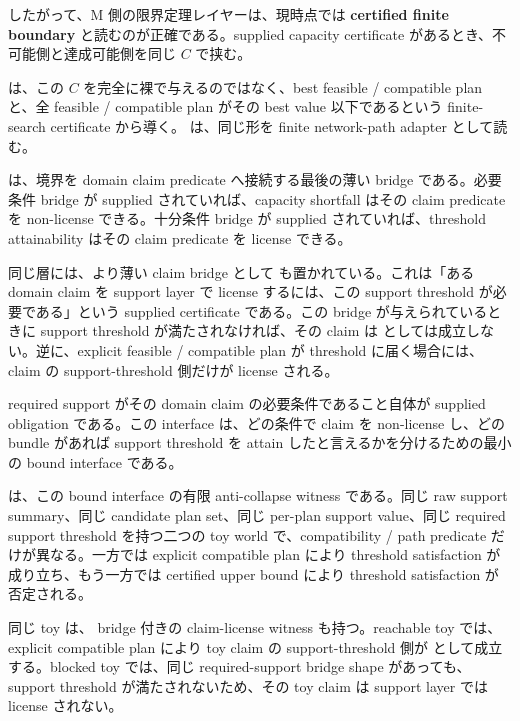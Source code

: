 \documentclass[12pt,a4paper]{article}
\begin{document}
したがって、M 側の限界定理レイヤーは、現時点では \textbf{certified finite boundary} と読むのが正確である。supplied capacity certificate があるとき、不可能側と達成可能側を同じ \(C\) で挟む。

{\scriptsize{}} は、この \(C\) を完全に裸で与えるのではなく、best feasible / compatible plan と、全 feasible / compatible plan がその best value 以下であるという finite-search certificate から導く。{\scriptsize{}} は、同じ形を finite network-path adapter として読む。

{\scriptsize{}} は、境界を domain claim predicate へ接続する最後の薄い bridge である。必要条件 bridge が supplied されていれば、capacity shortfall はその claim predicate を non-license できる。十分条件 bridge が supplied されていれば、threshold attainability はその claim predicate を license できる。

同じ層には、より薄い claim bridge として {\scriptsize{}} も置かれている。これは「ある domain claim を support layer で license するには、この support threshold が必要である」という supplied certificate である。この bridge が与えられているときに support threshold が満たされなければ、その claim は {\scriptsize{}} としては成立しない。逆に、explicit feasible / compatible plan が threshold に届く場合には、claim の support-threshold 側だけが license される。

required support がその domain claim の必要条件であること自体が supplied obligation である。この interface は、どの条件で claim を non-license し、どの bundle があれば support threshold を attain したと言えるかを分けるための最小の bound interface である。

{\scriptsize{}} は、この bound interface の有限 anti-collapse witness である。同じ raw support summary、同じ candidate plan set、同じ per-plan support value、同じ required support threshold を持つ二つの toy world で、compatibility / path predicate だけが異なる。一方では explicit compatible plan により threshold satisfaction が成り立ち、もう一方では certified upper bound により threshold satisfaction が否定される。

同じ toy は、{\scriptsize{}} bridge 付きの claim-license witness も持つ。reachable toy では、explicit compatible plan により toy claim の support-threshold 側が {\scriptsize{}} として成立する。blocked toy では、同じ required-support bridge shape があっても、support threshold が満たされないため、その toy claim は support layer では license されない。
\end{document}
